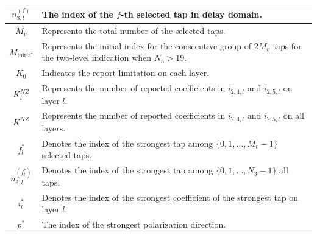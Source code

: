 \documentclass[lettersize,journal]{IEEEtran}
\begin{document}
\begin{table}[t]
\begin{center}
\begin{tabular}{|c|m{6cm}|}
\hline   $n_{3,l}^{(f)}$ &  The index of the $f$-th selected tap in delay domain. \\
\hline $M_v$ & Represents the total number of the selected taps.\\
\hline $M_{\textrm{initial}}$ & Represents the initial index for the consecutive group of $2M_v$ taps for the two-level indication when $N_3 >19$.\\
\hline $K_0$ & Indicates the report limitation on each layer.\\
\hline $K_l^{NZ}$ & Represents the number of reported coefficients in $i_{2,4,l}$ and $i_{2,5,l}$ on layer \(l\).\\
\hline $K^{NZ}$ & Represents the number of reported coefficients in $i_{2,4,l}$ and $i_{2,5,l}$ on all layers.\\
\hline $f_l^\ast$ & Denotes the index of the strongest tap among $\{0,1,\ldots,M_v-1\}$ selected taps.\\
\hline $n_{3,l}^{(f_l^\ast)}$ &  Denotes the index of the strongest tap among $\{0,1,\ldots,N_3-1\}$ all taps.\\
\hline $i_l^\ast$ & Denotes the index of the strongest coefficient of the strongest tap on layer \(l\).\\
\hline $p^\ast$ & The index of the strongest polarization direction.\\
\hline
\end{tabular}   
\end{center}   
\vspace{-12pt}
\end{table}
\end{document}
